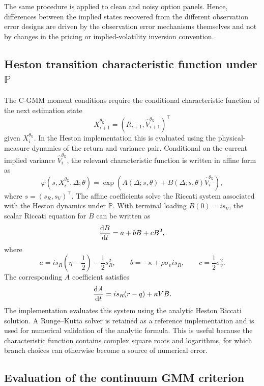 \documentclass[11pt,a4paper,notitlepage]{article}
\numberwithin{equation}{section}
\begin{document}
The same procedure is applied to clean and noisy option panels. Hence, differences between the implied states recovered from the different observation error designs are driven by the observation error mechanisms themselves and not by changes in the pricing or implied-volatility inversion convention.

\subsection{Heston transition characteristic function under \(\mathbb P\)}

The C-GMM moment conditions require the conditional characteristic function of the next estimation state
\[
X_{i+1}^{\theta_{\mathbb Q}}
=
\left(
R_{i+1},
\widehat V_{i+1}^{\theta_{\mathbb Q}}
\right)^\top
\]
given \(X_i^{\theta_{\mathbb Q}}\). In the Heston implementation this is evaluated using the physical-measure dynamics of the return and variance pair. Conditional on the current implied variance \(\widehat V_i^{\theta_{\mathbb Q}}\), the relevant characteristic function is written in affine form as
\[
\varphi\left(s,X_i^{\theta_{\mathbb Q}},\Delta;\theta\right)
=
\exp\left(
A(\Delta;s,\theta)
+
B(\Delta;s,\theta)
\widehat V_i^{\theta_{\mathbb Q}}
\right),
\label{eq:app_heston_transition_ccf}
\]
where \(s=(s_R,s_V)^\top\). The affine coefficients solve the Riccati system associated with the Heston dynamics under \(\mathbb P\). With terminal loading \(B(0)=is_V\), the scalar Riccati equation for \(B\) can be written as
\[
\frac{\dif B}{\dif t}
=
a+bB+cB^2,
\]
where
\[
a
=
is_R\left(\eta-\frac{1}{2}\right)
-\frac{1}{2}s_R^2,
\qquad
b
=
-\kappa+\rho\sigma_v is_R,
\qquad
c
=
\frac{1}{2}\sigma_v^2 .
\]
The corresponding \(A\) coefficient satisfies
\[
\frac{\dif A}{\dif t}
=
is_R(r-q)+\kappa\bar V B .
\]
The implementation evaluates this system using the analytic Heston Riccati solution. A Runge--Kutta solver is retained as a reference implementation and is used for numerical validation of the analytic formula. This is useful because the characteristic function contains complex square roots and logarithms, for which branch choices can otherwise become a source of numerical error.

\subsection{Evaluation of the continuum GMM criterion}
\end{document}
